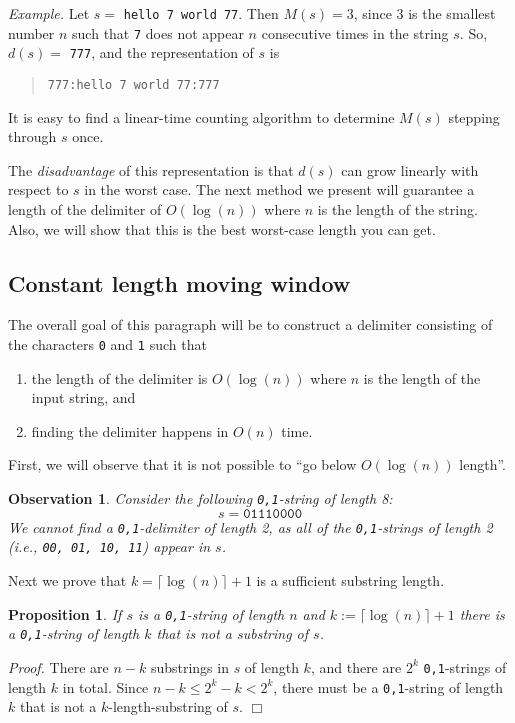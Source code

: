 \documentclass[12pt, a4paper]{amsart}
\newtheorem{proposition}[lemma]{\bf Proposition}
\newtheorem{observation}[lemma]{\bf Observation}
\begin{document}
{\em Example.} Let $s = $ {\tt hello 7 world 77}. Then $M(s) =3$, since
$3$ is the smallest number $n$ such that {\tt 7} does not appear
$n$ consecutive times in the string $s$. So, $d(s) = $ {\tt 777}, and
the representation of $s$ is

\begin{quote}
{\tt 777:hello 7 world 77:777}
\end{quote}

It is easy to find a linear-time counting algorithm to determine $M(s)$
stepping through $s$ once.

The {\em disadvantage} of this representation is that $d(s)$ can
grow linearly with respect to $s$ in the worst case.
The next method we present will guarantee a length of the delimiter
of $O(\log(n))$ where $n$ is the length of the string. Also, we will
show that this is the best worst-case length you can get.
\subsection{Constant length moving window}\label{bit}
The overall goal of this paragraph will be to construct a
delimiter consisting of the characters {\tt 0} and {\tt 1}
such that
\begin{enumerate}
\item the length of the delimiter is $O(\log(n))$ where
$n$ is the length of the input string, and
\item finding the delimiter happens in $O(n)$ time.
\end{enumerate}
First, we will observe that it is not possible
to ``go below $O(\log(n))$ length''.

\begin{observation} Consider the following {\tt 0,1}-string of length 8: 
$$s = \mathtt{01110000}$$
We cannot
find a {\tt 0,1}-delimiter of length 2, as all of the {\tt 0,1}-strings
of length 2 (i.e., {\tt 00, 01, 10, 11}) appear in $s$. 
\end{observation}

Next we prove that $k = \lceil \log(n)\rceil+1$ is a sufficient 
substring length.

\begin{proposition} If $s$ is a {\tt 0,1}-string of length $n$ 
and $k := \lceil \log(n)\rceil+1$ there is 
 a {\tt 0,1}-string of length $k$ that is {\em not} a substring of $s$.
\end{proposition}
{\em Proof.} There are $n - k$ substrings in $s$ 
of length $k$, and there are $2^k$ {\tt 0,1}-strings of length $k$ 
in total. Since $n-k \leq 2^k - k < 2^k$, there must be a 
{\tt 0,1}-string of length $k$ that is not a $k$-length-substring of 
$s$. $\Box$
\end{document}
